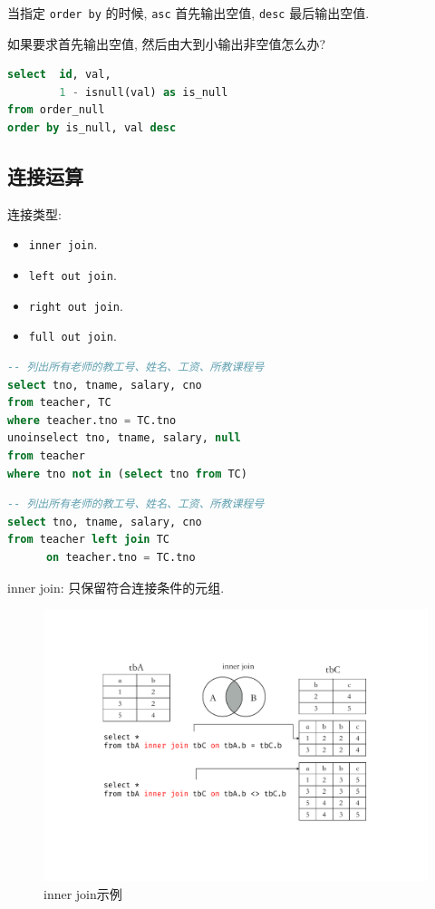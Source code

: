 当指定 \verb|order by| 的时候, \verb|asc| 首先输出空值, \verb|desc| 最后输出空值.

如果要求首先输出空值, 然后由大到小输出非空值怎么办?
\begin{lstlisting}[language=SQL]
select  id, val,
        1 - isnull(val) as is_null
from order_null
order by is_null, val desc
\end{lstlisting}

\subsection{连接运算}

连接类型:
\begin{itemize}
  \item \verb|inner join|.
  \item \verb|left out join|.
  \item \verb|right out join|.
  \item \verb|full out join|.
\end{itemize}

\begin{lstlisting}[language=SQL, caption={不用外连接表达查询的例子}]
-- 列出所有老师的教工号、姓名、工资、所教课程号
select tno, tname, salary, cno
from teacher, TC
where teacher.tno = TC.tno
unoinselect tno, tname, salary, null
from teacher
where tno not in (select tno from TC)
\end{lstlisting}

\begin{lstlisting}[language=SQL, caption={用外连接表达查询的例子}]
-- 列出所有老师的教工号、姓名、工资、所教课程号
select tno, tname, salary, cno
from teacher left join TC
      on teacher.tno = TC.tno
\end{lstlisting}

inner join: 只保留符合连接条件的元组.
\begin{figure}[H]
    \centering
    \includegraphics[width=.55\textwidth]{figure/inner_join.pdf}
    \caption{inner join示例}
\end{figure}

